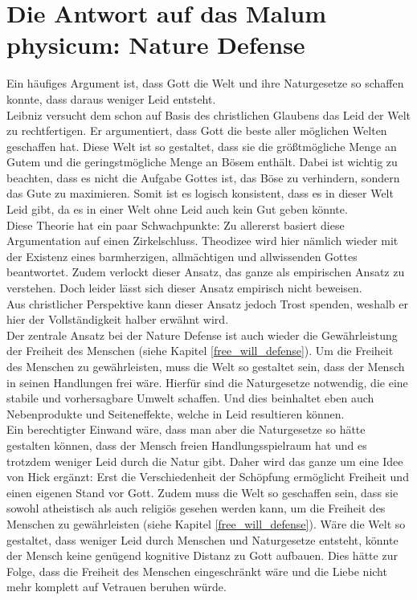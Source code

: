 \section{Die Antwort auf das Malum physicum: Nature Defense} \label{nature_defense}
Ein häufiges Argument ist, dass Gott die Welt und ihre Naturgesetze so schaffen konnte, dass daraus weniger Leid entsteht.\\

Leibniz versucht dem schon auf Basis des christlichen Glaubens das Leid der Welt zu rechtfertigen. Er argumentiert, dass Gott die beste aller möglichen Welten geschaffen hat. Diese Welt ist so gestaltet, dass sie die größtmögliche Menge an Gutem und die geringstmögliche Menge an Bösem enthält. Dabei ist wichtig zu beachten, dass es nicht die Aufgabe Gottes ist, das Böse zu verhindern, sondern das Gute zu maximieren. Somit ist es logisch konsistent, dass es in dieser Welt Leid gibt, da es in einer Welt ohne Leid auch kein Gut geben könnte.\\
Diese Theorie hat ein paar Schwachpunkte: Zu allererst basiert diese Argumentation auf einen Zirkelschluss. Theodizee wird hier nämlich wieder mit der Existenz eines barmherzigen, allmächtigen und allwissenden Gottes beantwortet. Zudem verlockt dieser Ansatz, das ganze als empirischen Ansatz zu verstehen. Doch leider lässt sich dieser Ansatz empirisch nicht beweisen.\\
Aus christlicher Perspektive kann dieser Ansatz jedoch Trost spenden, weshalb er hier der Vollständigkeit halber erwähnt wird.\\

Der zentrale Ansatz bei der Nature Defense ist auch wieder die Gewährleistung der Freiheit des Menschen (siehe Kapitel \ref{free_will_defense}). Um die Freiheit des Menschen zu gewährleisten, muss die Welt so gestaltet sein, dass der Mensch in seinen Handlungen frei wäre. Hierfür sind die Naturgesetze notwendig, die eine stabile und vorhersagbare Umwelt schaffen. Und dies beinhaltet eben auch Nebenprodukte und Seiteneffekte, welche in Leid resultieren können.\\
Ein berechtigter Einwand wäre, dass man aber die Naturgesetze so hätte gestalten können, dass der Mensch freien Handlungsspielraum hat und es trotzdem weniger Leid durch die Natur gibt. Daher wird das ganze um eine Idee von Hick ergänzt: Erst die Verschiedenheit der Schöpfung ermöglicht Freiheit und einen eigenen Stand vor Gott. Zudem muss die Welt so geschaffen sein, dass sie sowohl atheistisch als auch religiös gesehen werden kann, um die Freiheit des Menschen zu gewährleisten (siehe Kapitel \ref{free_will_defense}). Wäre die Welt so gestaltet, dass weniger Leid durch Menschen und Naturgesetze entsteht, könnte der Mensch keine genügend kognitive Distanz zu Gott aufbauen. Dies hätte zur Folge, dass die Freiheit des Menschen eingeschränkt wäre und die Liebe nicht mehr komplett auf Vetrauen beruhen würde. 

